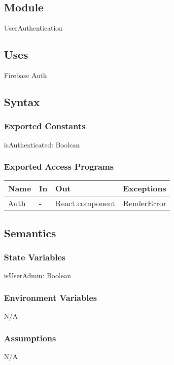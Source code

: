 \documentclass[12pt, titlepage]{article}
\begin{document}
\subsection{Module}
UserAuthentication

\subsection{Uses}
Firebase Auth\\

\subsection{Syntax}

\subsubsection{Exported Constants}
isAuthenticated: Boolean

\subsubsection{Exported Access Programs}

\begin{center}
\begin{tabular}{p{3cm} p{4cm} p{3cm} p{3.5cm}}
\hline
\textbf{Name} & \textbf{In} & \textbf{Out} & \textbf{Exceptions} \\
\hline
Auth & - & React.component &  RenderError\\
\hline
\end{tabular}
\end{center}

\subsection{Semantics}

\subsubsection{State Variables}
isUserAdmin: Boolean

\subsubsection{Environment Variables}
N/A

\subsubsection{Assumptions}
N/A
\end{document}
